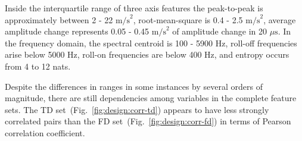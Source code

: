 Inside the interquartile range of three axis features the peak-to-peak is approximately between 2 - 22 $\mathrm{m/s}^2$, root-mean-square is 0.4 - 2.5 $\mathrm{m/s}^2$, average amplitude change represents 0.05 - 0.45 $\mathrm{m/s}^2$ of amplitude change in 20 $\mu\mathrm{s}$. In the frequency domain, the spectral centroid is 100 - 5900 Hz, roll-off frequencies arise below 5000 Hz, roll-on frequencies are below 400 Hz, and entropy occurs from 4 to 12 nats.

Despite the differences in ranges in some instances by several orders of magnitude, there are still dependencies among variables in the complete feature sets. The TD set~(Fig.~\ref{fig:design:corr-td}) appears to have less strongly correlated pairs than the FD set~(Fig.~\ref{fig:design:corr-fd}) in terms of Pearson correlation coefficient. 

